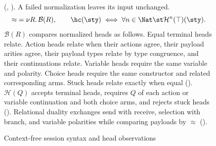 \begin{figure}[tp]
  (, ). A failed normalization leaves its input unchanged.
  \[
    {\approx}=\nu R.\,\mathcal B(R),\qquad
    \hc(\sty)\iff\forall n\in\Nat\st\mathcal H^n(\top)(\sty).
  \]
  $\mathcal B(R)$ compares normalized heads as follows. Equal terminal heads relate. Action heads relate
  when their actions agree, their payload arities agree, their payload
  types relate by type congruence, and their continuations relate.
  Variable heads require the same variable and polarity. Choice heads
  require the same constructor and related corresponding arms.
  Stuck heads relate exactly when equal ().
  $\mathcal H(Q)$ accepts terminal heads, requires $Q$ of each action
  or variable continuation and both choice arms, and rejects stuck heads
  ().
  Relational duality exchanges send with receive, selection with branch,
  and variable polarities while comparing payloads by $\approx$
  ().
  \caption{Context-free session syntax and head observations}
  \label{fig:cfst-syntax}
\end{figure}

